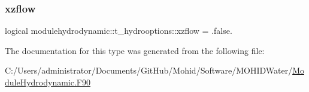 \mbox{\label{structmodulehydrodynamic_1_1t__hydrooptions_af920a925dde12970cc43309010e38c73}} 
\subsubsection{\texorpdfstring{xzflow}{xzflow}}
{\footnotesize\ttfamily logical modulehydrodynamic\+::t\+\_\+hydrooptions\+::xzflow = .false.\hspace{0.3cm}{\ttfamily [private]}}



The documentation for this type was generated from the following file\+:\begin{DoxyCompactItemize}
\item 
C\+:/\+Users/administrator/\+Documents/\+Git\+Hub/\+Mohid/\+Software/\+M\+O\+H\+I\+D\+Water/\mbox{\hyperlink{_module_hydrodynamic_8_f90}{Module\+Hydrodynamic.\+F90}}\end{DoxyCompactItemize}
